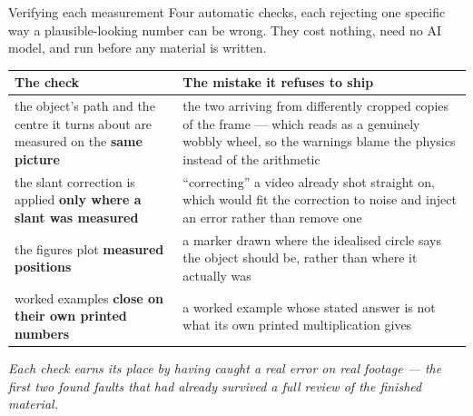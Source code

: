 \documentclass[aspectratio=169,10pt]{beamer}
\newcommand{\takeaway}[1]{\vfill{\footnotesize\itshape\color{cGrey}#1\par}}
\begin{document}
\begin{frame}{Verifying each measurement}
\small
Four automatic checks, each rejecting one specific way a plausible-looking number can be wrong.
They cost nothing, need no AI model, and run before any material is written.
\vspace{0.3em}
\scriptsize
\renewcommand{\arraystretch}{1.5}
\begin{tabular}{@{}p{5.0cm}p{7.6cm}@{}}
\toprule
\textbf{The check} & \textbf{The mistake it refuses to ship} \\
\midrule
the object's path and the centre it turns about are measured on the \textbf{same picture} &
the two arriving from differently cropped copies of the frame --- which reads as a genuinely
wobbly wheel, so the warnings blame the physics instead of the arithmetic \\
the slant correction is applied \textbf{only where a slant was measured} &
``correcting'' a video already shot straight on, which would fit the correction to noise and
inject an error rather than remove one \\
the figures plot \textbf{measured positions} &
a marker drawn where the idealised circle says the object should be, rather than where it
actually was \\
worked examples \textbf{close on their own printed numbers} &
a worked example whose stated answer is not what its own printed multiplication gives \\
\bottomrule
\end{tabular}
\takeaway{Each check earns its place by having caught a real error on real footage --- the first two
found faults that had already survived a full review of the finished material.}
\end{frame}
\end{document}
